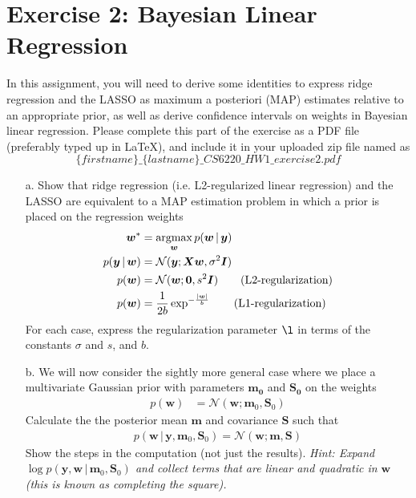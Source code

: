 \documentclass[11pt]{article}
\newcommand{\argmax}{\operatornamewithlimits{argmax}}
\renewcommand{\vec}[1]{\ensuremath{\boldsymbol{#1}}}
\renewcommand{\v}[1]{\vec{#1}}
\begin{document}
\section*{Exercise 2: Bayesian Linear Regression}

In this assignment, you will need to derive some identities to express ridge regression and the LASSO as maximum a posteriori (MAP) estimates relative to an appropriate prior, as well as derive confidence intervals on weights in Bayesian linear regression. Please complete this part of the exercise as a PDF file (preferably typed up in LaTeX), and include it in your uploaded zip file named as
\[ 
    \{firstname\}\_\{lastname\}\_CS6220\_HW1\_exercise2.pdf
\]

\begin{itemize}
\item[a.] Show that ridge regression (i.e. L2-regularized linear regression) and the LASSO are equivalent to a MAP estimation problem in which a prior is placed on the regression weights
\begin{align*}
    \v{w}^* 
    &= 
    \argmax_{\v{w}}
    p(\v{w} \,|\, \v{y})
    \\
    p(\v{y} \,|\, \v{w})
    &=
    \mathcal{N}(\v{y} ; \v{X} \v{w}, \sigma^2 \v{I})
    \\
    p(\v{w})
    &=
    \mathcal{N}(\v{w} ; \v{0}, s^2 \v{I})
    \qquad
    \text{(L2-regularization)}
    \\
    p(\v{w})
    &=
    \frac{1}{2 b} \exp^{-\frac{|\v{w}|}{b}}
    \qquad
    \text{(L1-regularization)}
\end{align*}
For each case, express the regularization parameter $\l$ in terms of the constants $\sigma$ and $s$, and $b$.

\item[b.] We will now consider the sightly more general case where we place a multivariate Gaussian prior with parameters $\v{m_0}$ and $\v{S_0}$ on the weights
\begin{align*}
    p(\v{w}) 
    &= 
    \mathcal{N}(\v{w} ; \v{m}_0, \v{S}_0)
\end{align*} 
Calculate the the posterior mean $\v{m}$ and covariance $\v{S}$ such that
\begin{align*}
    p(\v{w} \,|\, \v{y}, \v{m}_0, \v{S}_0)
    = 
    \mathcal{N}(\v{w} ; \v{m}, \v{S})
\end{align*}
Show the steps in the computation (not just the results). \emph{Hint: Expand $\log p(\v{y},\v{w} \,|\, \v{m}_0, \v{S}_0)$ and collect terms that are linear and quadratic in $\v{w}$ (this is known as completing the square).}
\end{itemize}
\end{document}
